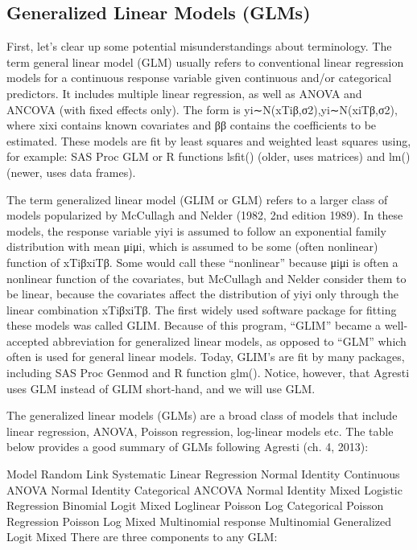 \subsection*{Generalized Linear Models (GLMs)}
 First, let’s clear up some potential misunderstandings about terminology.  The term general linear model (GLM) usually refers to conventional linear regression models for a continuous response variable given continuous and/or categorical predictors. It includes multiple linear regression, as well as ANOVA and ANCOVA (with fixed effects only). The form is yi∼N(xTiβ,σ2),yi∼N(xiTβ,σ2), where xixi contains known covariates and ββ contains the coefficients to be estimated. These models are fit by least squares and weighted least squares using, for example: SAS Proc GLM or R functions lsfit() (older, uses matrices) and lm() (newer, uses data frames).

The term generalized linear model (GLIM or GLM) refers to a larger class of models popularized by McCullagh and Nelder (1982, 2nd edition 1989). In these models, the response variable yiyi is assumed to follow an exponential family distribution with mean μiμi, which is assumed to be some (often nonlinear) function of xTiβxiTβ. Some would call these “nonlinear” because  μiμi is often a nonlinear function of the covariates, but McCullagh and Nelder consider them to be linear, because the covariates affect the distribution of yiyi only through the linear combination xTiβxiTβ.   The first widely used software package for fitting these models was called GLIM. Because of this program, “GLIM” became a well-accepted abbreviation for generalized linear models, as opposed to “GLM” which often is used for general linear models. Today, GLIM’s are fit by many packages, including SAS Proc Genmod and R function glm(). Notice, however, that Agresti uses GLM instead of GLIM short-hand, and we will use GLM. 

The generalized linear models (GLMs) are a broad class of models that include linear regression, ANOVA, Poisson regression, log-linear models etc. The table below provides a good summary of GLMs following Agresti (ch. 4, 2013):

Model	Random	Link	Systematic
Linear Regression	Normal	Identity	Continuous
ANOVA	Normal	Identity	Categorical
ANCOVA	Normal	Identity	Mixed
Logistic Regression	Binomial	Logit	Mixed
Loglinear	Poisson	Log	Categorical
Poisson Regression	Poisson	Log	Mixed
Multinomial response	Multinomial	Generalized Logit	Mixed
There are three components to any GLM:

